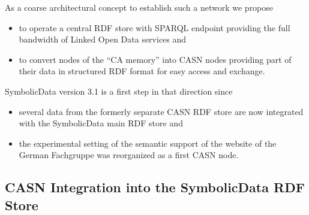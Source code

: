 \documentclass{llncs}
\newcommand{\SD}{{\sc Symbo\-lic\-Data}}
\begin{document}
As a coarse architectural concept to establish such a network we propose
\begin{itemize}
\item to operate a central RDF store with SPARQL endpoint providing the full
  bandwidth of Linked Open Data services and 
\item to convert nodes of the ``CA memory'' into CASN nodes providing part of
  their data in structured RDF format for easy access and exchange.
\end{itemize}
{\SD} version 3.1 is a first step in that direction since
\begin{itemize}
\item several data from the formerly separate CASN RDF store are now
  integrated with the {\SD} main RDF store \cite{sdstore} and
\item the experimental setting of the semantic support of the website of the
  German Fachgruppe \cite{cafg} was reorganized as a first CASN node.
\end{itemize}

\subsection*{CASN Integration into the {\SD} RDF Store}
\end{document}
